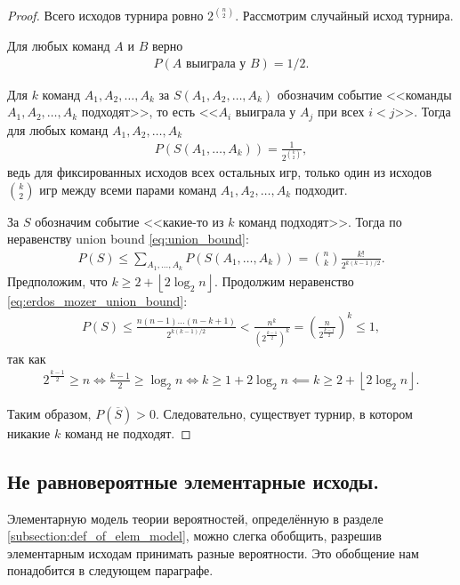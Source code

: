 \documentclass[../main.tex]{subfiles}
\begin{document}
\begin{proof}
 Всего исходов турнира ровно $ 2^{\binom n 2} $. Рассмотрим случайный исход турнира.

 Для любых команд $ A $ и $B $ верно
 \begin{align*}
  P(A \text{ выиграла у } B) = 1 / 2
 .\end{align*}

 Для $ k $ команд $A_1,A_2,\ldots,A_k$ за $ S(A_1, A_2, \ldots, A_k) $  обозначим событие <<команды $ A_1,A_2,\ldots,A_k $ подходят>>, то есть <<$ A_i $ выиграла у $ A_j $ при всех $ i < j $>>. Тогда для любых команд $ A_1,A_2,\ldots,A_k $ 
 \begin{align*}
  P(S(A_1,\ldots,A_k)) = \frac{1}{2^{\binom k 2}},
 \end{align*} ведь для фиксированных исходов всех остальных игр, только один из исходов $ \binom k 2 $ игр между всеми парами команд $ A_1,A_2,\ldots,A_k $  подходит.

 За $ S $ обозначим событие <<какие-то из $ k $ команд подходят>>. Тогда по неравенству union bound \eqref{eq:union_bound}:
 \begin{align}
  \label{eq:erdos_mozer_union_bound}
  P(S) \leqslant \sum_{A_1,\ldots,A_k} P(S(A_1,\ldots,A_k)) = \binom n k \frac{k!}{2^{k(k-1) / 2}}.
 \end{align} Предположим, что $ k \geqslant 2 + \left\lfloor 2\log_2 n \right\rfloor  $. Продолжим неравенство \eqref{eq:erdos_mozer_union_bound}:
 \begin{align*}
  P(S) \leqslant \frac{n (n-1) \ldots (n-k+1)}{2^{k(k-1) / 2}} < \frac{n^{k}}{\left(2^{\frac{k-1}{2}}\right)^{k}} = \left(\frac{n}{2^{\frac{k-1}{2}}}\right)^{k} \leqslant 1,
 \end{align*} так как
 \begin{align*}
  2^{\frac{k-1}{2}} \geqslant n \iff \frac{k-1}{2} \geqslant \log_2 n \iff k \geqslant 1 + 2  \log_2 n \impliedby k \geqslant 2 + \left\lfloor 2 \log_2 n \right\rfloor.
 \end{align*}

 Таким образом, $ P(\overline S) > 0$. Следовательно, существует турнир, в котором никакие $k$ команд не подходят.
\end{proof}

\subsection{Не равновероятные элементарные исходы.}

Элементарную модель теории вероятностей, определённую в разделе \ref{subsection:def_of_elem_model}, можно слегка обобщить, разрешив элементарным исходам принимать разные вероятности. Это обобщение нам понадобится в следующем параграфе.
\end{document}
